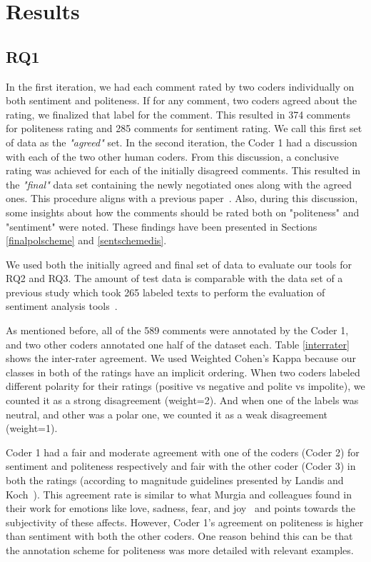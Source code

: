  
\section{Results}

\subsection{RQ1 }\label{gt}

In the first iteration, we had each comment rated by two coders individually on both sentiment and politeness. If for any comment, two coders agreed about the rating, we finalized that label for the comment. This resulted in 374 comments for politeness rating and 285 comments for sentiment rating. We call this first set of data as the \textit{"agreed"} set.
In the second iteration, the Coder 1 had a discussion with each of the two other human coders. From this discussion, a conclusive rating was achieved for each of the initially disagreed comments. This resulted in the \textit{"final" }data set containing the newly negotiated ones along with the agreed ones. This procedure aligns with a previous paper~\cite{ahmed2017senticr}. Also, during this discussion, some insights about how the comments should be rated both on "politeness" and "sentiment" were noted. These findings have been presented in Sections \ref{finalpolscheme} and \ref{sentschemedis}.

We used both the initially agreed and final set of data to evaluate our tools for RQ2 and RQ3. The amount of test data is comparable with the data set of a previous study which took 265 labeled texts to perform the evaluation of sentiment analysis tools~\cite{jongeling2017negative}.

As mentioned before, all of the 589 comments were annotated by the Coder 1, and two other coders annotated one half of the dataset each. Table \ref{interrater} shows the inter-rater agreement. We used Weighted Cohen's Kappa because our classes in both of the ratings have an implicit ordering. When two coders labeled different polarity for their ratings (positive vs negative and polite vs impolite), we counted it as a strong disagreement (weight=2). And when one of the labels was neutral, and other was a polar one, we counted it as a weak disagreement (weight=1).

Coder 1 had a fair and moderate agreement with one of the coders (Coder 2) for sentiment and politeness respectively and fair with the other coder (Coder 3) in both the ratings (according to magnitude guidelines presented by Landis and Koch~\cite{landis1977measurement}). This agreement rate is similar to what Murgia and colleagues found in their work for emotions like love, sadness, fear, and joy~\cite{murgia2014developers} and points towards the subjectivity of these affects. However, Coder 1's agreement on politeness is higher than sentiment with both the other coders. One reason behind this can be that the annotation scheme for politeness was more detailed with relevant examples. 

